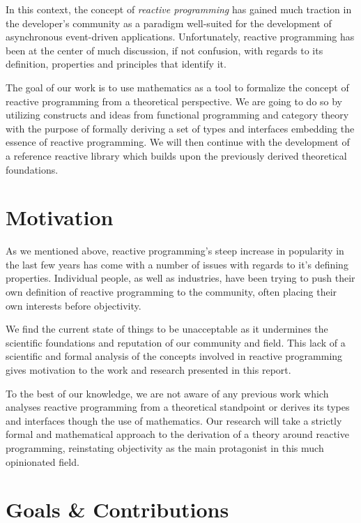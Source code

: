 In this context, the concept of \textit{reactive programming} has gained much traction in the developer's community as a paradigm well-suited for the development of asynchronous  event-driven applications\cite{bainomugisha2013survey}. Unfortunately, reactive programming has been at the center of much discussion, if not confusion, with regards to its definition, properties and principles that identify it\cite{meijer2014reactive}.

The goal of our work is to use mathematics as a tool to formalize the concept of reactive programming from a theoretical perspective.  We are going to do so by utilizing constructs and ideas from functional programming and category theory with the purpose of formally deriving a set of types and interfaces embedding the essence of reactive programming. We will then continue with the development of a reference reactive library which builds upon the previously derived theoretical foundations. 

\section*{Motivation}

As we mentioned above, reactive programming's steep increase in popularity in the last few years\cite{bainomugisha2013survey} has come with a number of issues with regards to it's defining properties. Individual people, as well as industries, have been trying to push their own definition of reactive programming to the community, often placing their own interests before objectivity\cite{meijer2014reactive}.

We find the current state of things to be unacceptable as it undermines the scientific foundations and reputation of our community and field. This lack of a scientific and formal analysis of the concepts involved in reactive programming gives motivation to the work and research presented in this report.

To the best of our knowledge, we are not aware of any previous work which analyses reactive programming from a theoretical standpoint or derives its types and interfaces though the use of mathematics. Our research will take a strictly formal and mathematical approach to the derivation of a theory around reactive programming, reinstating objectivity as the main protagonist in this much opinionated field.

\section*{Goals \& Contributions}

